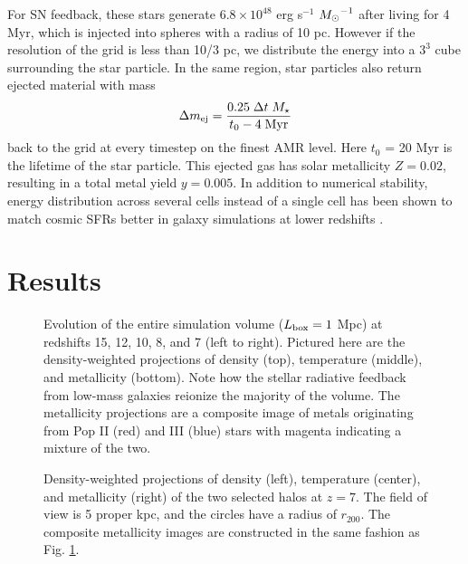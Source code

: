 \documentclass[12pt,preprint]{aastex}
\begin{document}
For SN feedback, these stars generate $6.8 \times 10^{48}$ erg
s$^{-1}$ $\Ms^{-1}$ after living for 4 Myr, which is injected into
spheres with a radius of 10 pc.  However if the resolution of the grid
is less than 10/3 pc, we distribute the energy into a $3^3$ cube
surrounding the star particle.  In the same region, star particles
also return ejected material with mass
%
\begin{equation}
  \label{eqn:SNmass}
  \Delta m_{\rm ej} = \frac{0.25 \; \Delta t \; M_\star} 
         {t_0 - 4\;\mathrm{Myr}}
\end{equation}
back to the grid at every timestep on the finest AMR level.  Here
$t_0$ = 20 Myr is the lifetime of the star particle.  This ejected gas
has solar metallicity $Z = 0.02$, resulting in a total metal yield $y
= 0.005$.  In addition to numerical stability, energy distribution
across several cells instead of a single cell has been shown to match
cosmic SFRs better in galaxy simulations at lower redshifts
\citep{Smith11}.

\section{Results}
\label{sec:results}


\begin{figure*}
  \caption{\label{fig:evo-mosaic} Evolution of the entire simulation
    volume ($L_{\rm box} = 1$ Mpc) at redshifts 15, 12, 10, 8, and 7
    (left to right).  Pictured here are the density-weighted
    projections of density (top), temperature (middle), and
    metallicity (bottom).  Note how the stellar radiative feedback
    from low-mass galaxies reionize the majority of the volume.  The
    metallicity projections are a composite image of metals
    originating from Pop II (red) and III (blue) stars with magenta
    indicating a mixture of the two.}
\end{figure*}



\begin{figure}
  \caption{\label{fig:halo-mosaic} Density-weighted projections of
    density (left), temperature (center), and metallicity (right) of
    the two selected halos at $z=7$.  The field of view is 5 proper
    kpc, and the circles have a radius of $r_{200}$.  The composite
    metallicity images are constructed in the same fashion as
    Fig. \ref{fig:evo-mosaic}.}
\end{figure}
\end{document}
